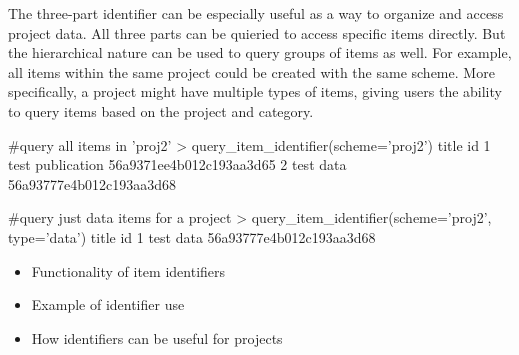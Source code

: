 The three-part identifier can be especially useful as a way to organize and 
access project data. All three parts can be quieried to access specific items 
directly. But the hierarchical nature can be used to query groups of items as well. 
For example, all items within the same project could be created with the same 
scheme. More specifically, a project might have multiple types of items, giving
users the ability to query items based on the project and category.

\begin{example}
#query all items in 'proj2'
> query_item_identifier(scheme='proj2')
             title                       id
1 test publication 56a9371ee4b012c193aa3d65
2        test data 56a93777e4b012c193aa3d68

#query just data items for a project
> query_item_identifier(scheme='proj2', type='data')
      title                       id
1 test data 56a93777e4b012c193aa3d68

\end{example}


\begin{itemize}
	\item{Functionality of item identifiers}
	\item{Example of identifier use}
	\item{How identifiers can be useful for projects}
\end{itemize}
